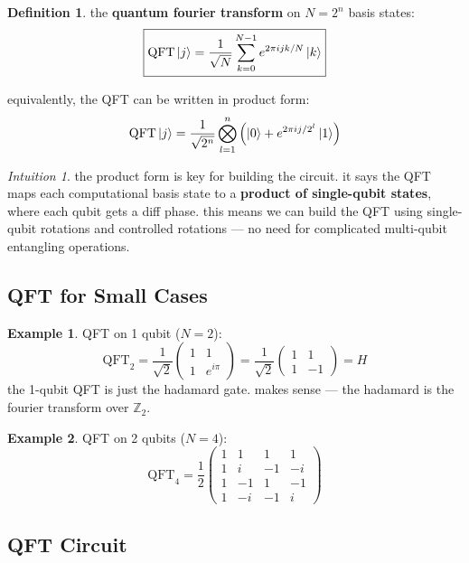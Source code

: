 \documentclass[11pt,a4paper]{article}
\theoremstyle{definition}
\newtheorem{definition}{Definition}[section]
\newtheorem{example}{Example}[section]
\theoremstyle{remark}
\newtheorem*{intuition}{Intuition}
\begin{document}
\begin{definition}
the \textbf{quantum fourier transform} on $N = 2^n$ basis states:
\[
\boxed{\text{QFT}\ket{j} = \frac{1}{\sqrt{N}}\sum_{k=0}^{N-1} e^{2\pi ijk/N}\ket{k}}
\]
\end{definition}

equivalently, the QFT can be written in product form:
\[
\text{QFT}\ket{j} = \frac{1}{\sqrt{2^n}} \bigotimes_{l=1}^{n} \left(\ket{0} + e^{2\pi i j/2^l}\ket{1}\right)
\]

\begin{intuition}
the product form is key for building the circuit. it says the QFT maps each computational basis state to a \textbf{product of single-qubit states}, where each qubit gets a diff phase. this means we can build the QFT using single-qubit rotations and controlled rotations --- no need for complicated multi-qubit entangling operations.
\end{intuition}

\subsection{QFT for Small Cases}

\begin{example}
QFT on 1 qubit ($N = 2$):
\[
\text{QFT}_2 = \frac{1}{\sqrt{2}}\begin{pmatrix} 1 & 1 \\ 1 & e^{i\pi} \end{pmatrix} = \frac{1}{\sqrt{2}}\begin{pmatrix} 1 & 1 \\ 1 & -1 \end{pmatrix} = H
\]
the 1-qubit QFT is just the hadamard gate. makes sense --- the hadamard is the fourier transform over $\mathbb{Z}_2$.
\end{example}

\begin{example}
QFT on 2 qubits ($N = 4$):
\[
\text{QFT}_4 = \frac{1}{2}\begin{pmatrix} 1 & 1 & 1 & 1 \\ 1 & i & -1 & -i \\ 1 & -1 & 1 & -1 \\ 1 & -i & -1 & i \end{pmatrix}
\]
\end{example}

\subsection{QFT Circuit}
\end{document}
